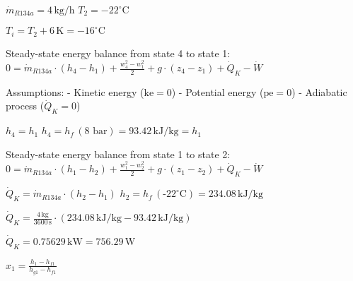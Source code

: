 \( \dot{m}_{R134a} = 4 \, \text{kg/h} \)  
\( T_2 = -22^\circ \text{C} \)  

\( T_i = T_2 + 6 \, \text{K} = -16^\circ \text{C} \)  

Steady-state energy balance from state 4 to state 1:  
\( 0 = \dot{m}_{R134a} \cdot (h_4 - h_1) + \frac{w_4^2 - w_1^2}{2} + g \cdot (z_4 - z_1) + \dot{Q}_K - \dot{W} \)  

Assumptions:  
- Kinetic energy (\( \text{ke} = 0 \))  
- Potential energy (\( \text{pe} = 0 \))  
- Adiabatic process (\( \dot{Q}_K = 0 \))  

\( h_4 = h_1 \)  
\( h_4 = h_f \, (\text{8 bar}) = 93.42 \, \text{kJ/kg} = h_1 \)  

Steady-state energy balance from state 1 to state 2:  
\( 0 = \dot{m}_{R134a} \cdot (h_1 - h_2) + \frac{w_1^2 - w_2^2}{2} + g \cdot (z_1 - z_2) + \dot{Q}_K - \dot{W} \)  

\( \dot{Q}_K = \dot{m}_{R134a} \cdot (h_2 - h_1) \)  
\( h_2 = h_f \, (\text{-22}^\circ \text{C}) = 234.08 \, \text{kJ/kg} \)  

\( \dot{Q}_K = \frac{4 \, \text{kg}}{3600 \, \text{s}} \cdot (234.08 \, \text{kJ/kg} - 93.42 \, \text{kJ/kg}) \)  

\( \dot{Q}_K = 0.75629 \, \text{kW} = 756.29 \, \text{W} \)  

\( x_1 = \frac{h_1 - h_{f1}}{h_{g1} - h_{f1}} \)